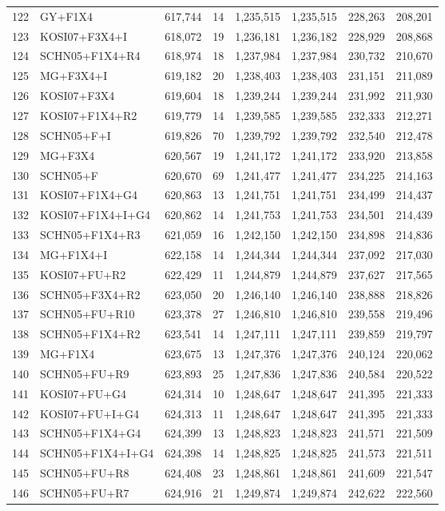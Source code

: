 \begin{table}
\begin{longtable}{rlrrrrrr}
122&GY+F1X4&617,744&14&1,235,515&1,235,515&228,263&208,201\\
123&KOSI07+F3X4+I&618,072&19&1,236,181&1,236,182&228,929&208,868\\
124&SCHN05+F1X4+R4&618,974&18&1,237,984&1,237,984&230,732&210,670\\
125&MG+F3X4+I&619,182&20&1,238,403&1,238,403&231,151&211,089\\
126&KOSI07+F3X4&619,604&18&1,239,244&1,239,244&231,992&211,930\\
127&KOSI07+F1X4+R2&619,779&14&1,239,585&1,239,585&232,333&212,271\\
128&SCHN05+F+I&619,826&70&1,239,792&1,239,792&232,540&212,478\\
129&MG+F3X4&620,567&19&1,241,172&1,241,172&233,920&213,858\\
130&SCHN05+F&620,670&69&1,241,477&1,241,477&234,225&214,163\\
131&KOSI07+F1X4+G4&620,863&13&1,241,751&1,241,751&234,499&214,437\\
132&KOSI07+F1X4+I+G4&620,862&14&1,241,753&1,241,753&234,501&214,439\\
133&SCHN05+F1X4+R3&621,059&16&1,242,150&1,242,150&234,898&214,836\\
134&MG+F1X4+I&622,158&14&1,244,344&1,244,344&237,092&217,030\\
135&KOSI07+FU+R2&622,429&11&1,244,879&1,244,879&237,627&217,565\\
136&SCHN05+F3X4+R2&623,050&20&1,246,140&1,246,140&238,888&218,826\\
137&SCHN05+FU+R10&623,378&27&1,246,810&1,246,810&239,558&219,496\\
138&SCHN05+F1X4+R2&623,541&14&1,247,111&1,247,111&239,859&219,797\\
139&MG+F1X4&623,675&13&1,247,376&1,247,376&240,124&220,062\\
140&SCHN05+FU+R9&623,893&25&1,247,836&1,247,836&240,584&220,522\\
141&KOSI07+FU+G4&624,314&10&1,248,647&1,248,647&241,395&221,333\\
142&KOSI07+FU+I+G4&624,313&11&1,248,647&1,248,647&241,395&221,333\\
143&SCHN05+F1X4+G4&624,399&13&1,248,823&1,248,823&241,571&221,509\\
144&SCHN05+F1X4+I+G4&624,398&14&1,248,825&1,248,825&241,573&221,511\\
145&SCHN05+FU+R8&624,408&23&1,248,861&1,248,861&241,609&221,547\\
146&SCHN05+FU+R7&624,916&21&1,249,874&1,249,874&242,622&222,560\\

\end{longtable}
\end{table}

